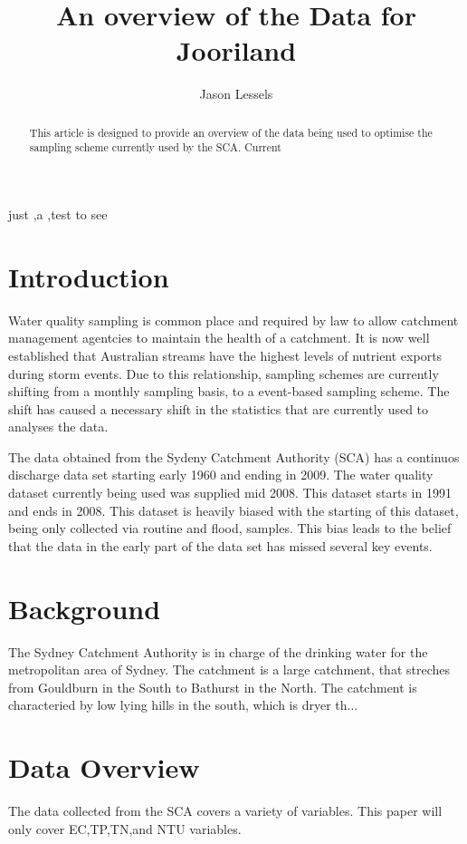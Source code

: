 \documentclass[5p]{elsarticle}
\begin{document}
\begin{frontmatter}
\title{An overview of the Data for Jooriland}
\author[jsl]{Jason Lessels}
\address[jsl]{The University of Sydney}
\begin{abstract}
This article is designed to provide an overview of the data being used to optimise the sampling scheme currently used by the SCA. Current
\end{abstract}
\begin{keyword}
just \sep a \sep test to see
\end{keyword}

\end{frontmatter}
\section*{Introduction}
Water quality sampling is common place and required by law to allow catchment management agentcies to maintain the health of a catchment. It is now well established that Australian streams have the highest levels of nutrient exports during storm events. Due to this relationship, sampling schemes are currently shifting from a monthly sampling basis, to a event-based sampling scheme. The shift has caused a necessary shift in the statistics that are currently used to analyses the data.

The data obtained from the Sydeny Catchment Authority (SCA) has a continuos discharge data set starting early 1960 and ending in 2009. The water quality dataset currently being used was supplied mid 2008. This dataset starts in 1991 and ends in 2008. This dataset is heavily biased with the starting of this dataset, being only collected via routine and flood, samples. This bias leads to the belief that the data in the early part of the data set has missed several key events.
\section*{Background}
The Sydney Catchment Authority is in charge of the drinking water for the metropolitan area of Sydney. The catchment is a large catchment, that streches from Gouldburn in the South to Bathurst in the North. The catchment is characteried by low lying hills in the south, which is dryer th...

\section*{Data Overview}
The data collected from the SCA covers a variety of variables. This paper will only cover EC,TP,TN,and NTU variables.
\end{document}
